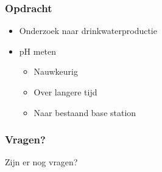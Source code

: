 \documentclass[compress]{beamer}
\begin{document}
    \begin{frame}
        \frametitle{Opdracht}

    


        \begin{itemize}
            \item Onderzoek naar drinkwaterproductie
            \item pH meten 
            \begin{itemize}
                \item Nauwkeurig
                \item Over langere tijd
                \item Naar bestaand base station
            \end{itemize}
        \end{itemize}




    \end{frame}

    
    
    

    

    

    \begin{frame}
        \frametitle{Vragen?}
        
        \centering
        Zijn er nog vragen?
    
    \end{frame}
\end{document}
